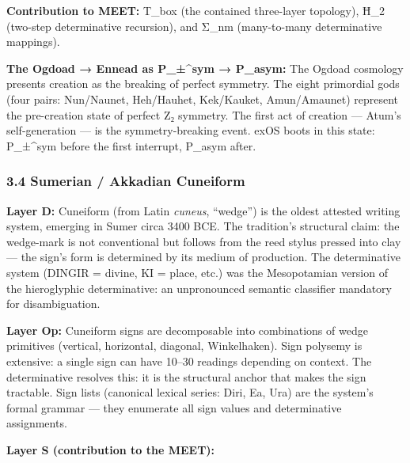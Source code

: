 \documentclass[
  11pt,
  a4paper,
]{article}
\begin{document}
\textbf{Contribution to MEET:} T\_box (the contained three-layer
topology), Ħ\_2 (two-step determinative recursion), and Σ\_nm
(many-to-many determinative mappings).

\textbf{The Ogdoad → Ennead as P\_±\^{}sym → P\_asym:} The Ogdoad
cosmology presents creation as the breaking of perfect symmetry. The
eight primordial gods (four pairs: Nun/Naunet, Heh/Hauhet, Kek/Kauket,
Amun/Amaunet) represent the pre-creation state of perfect Z₂ symmetry.
The first act of creation --- Atum's self-generation --- is the
symmetry-breaking event. exOS boots in this state: P\_±\^{}sym before
the first interrupt, P\_asym after.

\subsubsection{3.4 Sumerian / Akkadian
Cuneiform}\label{sumerian-akkadian-cuneiform}

\textbf{Layer D:} Cuneiform (from Latin \emph{cuneus}, ``wedge'') is the
oldest attested writing system, emerging in Sumer circa 3400 BCE. The
tradition's structural claim: the wedge-mark is not conventional but
follows from the reed stylus pressed into clay --- the sign's form is
determined by its medium of production. The determinative system (DINGIR
= divine, KI = place, etc.) was the Mesopotamian version of the
hieroglyphic determinative: an unpronounced semantic classifier
mandatory for disambiguation.

\textbf{Layer Op:} Cuneiform signs are decomposable into combinations of
wedge primitives (vertical, horizontal, diagonal, Winkelhaken). Sign
polysemy is extensive: a single sign can have 10--30 readings depending
on context. The determinative resolves this: it is the structural anchor
that makes the sign tractable. Sign lists (canonical lexical series:
Diri, Ea, Ura) are the system's formal grammar --- they enumerate all
sign values and determinative assignments.

\textbf{Layer S (contribution to the MEET):}
\end{document}
